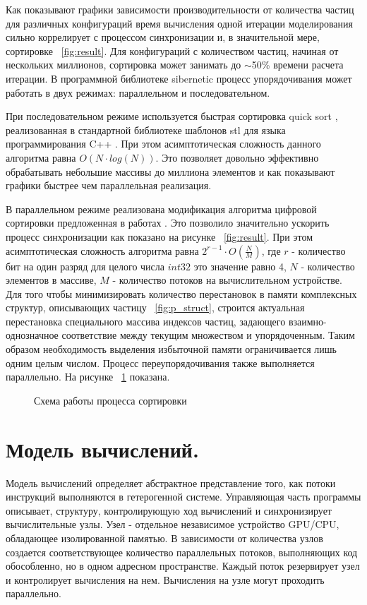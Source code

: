 Как показывают графики зависимости производительности от количества частиц для различных конфигураций время вычисления одной итерации моделирования сильно коррелирует с процессом синхронизации и, в значительной мере, сортировке ~\ref{fig:result}. Для  конфигураций с количеством частиц, начиная от нескольких миллионов, сортировка может занимать до \(\sim \)50\% времени расчета итерации. В программной библиотеке sibernetic \cite{Palyanov2016} процесс упорядочивания может работать в двух режимах: параллельном и последовательном.

При последовательном режиме используется быстрая сортировка quick sort \cite{Hoare1962}, реализованная в стандартной библиотеке шаблонов stl \cite{Stepanov1995} для языка программирования C++ \cite{Stroustrup2013}. При этом асимптотическая сложность данного алгоритма равна \( O(N \cdot log(N)) \). Это позволяет довольно эффективно обрабатывать небольшие массивы до миллиона элементов и как показывают графики быстрее чем параллельная реализация.

В параллельном режиме реализована модификация алгоритма цифровой сортировки предложенная в работах \cite{Knuth1998, Marcho1991}. Это позволило значительно ускорить процесс синхронизации как показано на рисунке ~\ref{fig:result}. При этом асимптотическая сложность алгоритма равна \( 2^{r-1} \cdot O(\frac{N}{M}) \), где \( r \) - количество бит на один разряд для целого числа \( int32 \) это значение равно 4, \( N \) - количество элементов в массиве, \( M \) - количество потоков на вычислительном устройстве. Для того чтобы минимизировать количество перестановок в памяти комплексных структур, описывающих частицу ~\ref{fig:p_struct}, строится актуальная перестановка специального массива  индексов частиц, задающего взаимно-однозначное соответствие между текущим множеством и упорядоченным. Таким образом необходимость выделения избыточной памяти ограничивается лишь одним целым числом.
Процесс переупорядочивания также выполняется параллельно. На рисунке ~\ref{fig:sort1} показана.
\begin{figure}[ht]
  \caption{Схема работы процесса сортировки}\label{fig:sort1}
\end{figure}

\section{Модель вычислений.}\label{sec:ch3/sect3}

Модель вычислений определяет абстрактное представление того, как потоки инструкций выполняются в гетерогенной системе. Управляющая часть программы описывает, структуру, контролирующую ход вычислений и синхронизирует вычислительные узлы. Узел - отдельное независимое устройство GPU/CPU, обладающее изолированной памятью. В зависимости от количества узлов создается соответствующее количество параллельных потоков, выполняющих код обособленно, но в одном адресном пространстве. Каждый поток резервирует узел и контролирует вычисления на нем. Вычисления на узле могут проходить параллельно.

